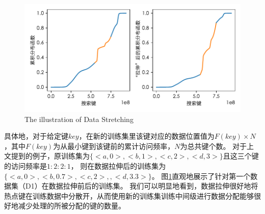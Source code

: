 
\begin{figure}[!htp]
  \centering
  \includegraphics{figure/stretching.pdf}
    {The illustration of Data Stretching}
  \label{fig:stretch-illus}
\end{figure}

具体地，对于给定键$key$，在新的训练集里该键对应的数据位置值为$F(key) \times N$，其中$F(key)$为从最小键到该键前的累计访问频率，$N$为总共键个数。
对于上文提到的例子，原训练集为$\{<a, 0>, <b, 1>, <c, 2>, <d, 3>\}$且这三个键的访问频率是$1:2:2:1$，
则在数据拉伸后的训练集为$\{<a, 0>, <b, 0.7>, <c, 2>, , <d, 3.3>\}$。
图\ref{fig:stretch-illus}直观地展示了针对第一个数据集（D1）在数据拉伸前后的训练集。
我们可以明显地看到，数据拉伸很好地将热点键在训练数据中分散开，从而使用新的训练集训练中间级{\model}进行数据分配能够很好地减少处理{\hotkey}的{\model}所被分配的键的数量。

